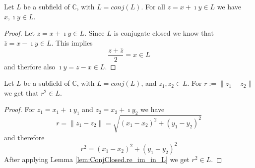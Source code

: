 \begin{lemma}
    \label{lem:ConjClosed.re_im_in_L}
    \leanok
    Let $L$ be a subfield of $\mathbb{C}$, with $L = conj(L)$. For all $z = x + \imath y \in L$ we have $x, \imath y \in L$.
\end{lemma}
\begin{proof}
    Let $z = x + \imath y \in L$. Since $L$ is conjugate closed we know that $\overline{z}=x-\imath y \in L$. This implies
    \begin{equation*}
        \frac{z + \overline{z}}{2} = x \in L
    \end{equation*}
    and therfore also $\imath y = z - x \in L$.
\end{proof}


\begin{lemma}
    \label{lem:ConjClosed.dist_sqard_in_L}
    \leanok
    Let $L$ be a subfield of $\mathbb{C}$, with $L = conj(L)$, and $z_1, z_2 \in L$.
    For $r := \|z_1-z_2\|$ we get that $r^2 \in L$.
\end{lemma}
\begin{proof}
    For $z_1 = x_1 + \imath y_1$ and $z_2 = x_2 + \imath y_2$ we have
    \begin{equation*}
        r = \|z_1 - z_2\| = \sqrt{(x_1 - x_2)^2 + (y_1 - y_2)^2}
    \end{equation*}
    and therefore
    \begin{equation*}
        r^2 = (x_1 - x_2)^2 + (y_1 - y_2)^2 
    \end{equation*}
    After applying Lemma \ref{lem:ConjClosed.re_im_in_L} we get $r^2 \in L$.
\end{proof}

